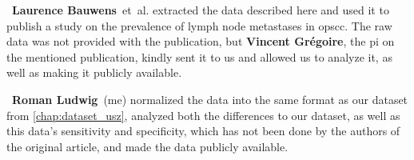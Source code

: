 \begin{tcolorbox}[title=\faIcon{users} Contributions, parbox=false]
    ~\textbf{Laurence Bauwens}~et~al.\cite{bauwens_prevalence_2021} extracted the data described here and used it to publish a study on the prevalence of lymph node metastases in \gls{opscc}. The raw data was not provided with the publication, but  \textbf{Vincent Grégoire}, the \gls{pi} on the mentioned publication, kindly sent it to us and allowed us to analyze it, as well as making it publicly available.

    ~\textbf{Roman Ludwig}~(me) normalized the data into the same format as our dataset from \cref{chap:dataset_usz}, analyzed both the differences to our dataset, as well as this data's sensitivity and specificity, which has not been done by the authors of the original article, and made the data publicly available.
\end{tcolorbox}
